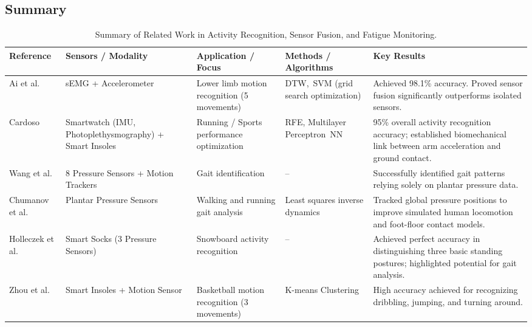 \subsection{Summary}
\label{ssec:rw_summary}

\begin{table}[ht]
\centering
\caption{Summary of Related Work in Activity Recognition, Sensor Fusion, and Fatigue Monitoring.}
\label{tab:related_work}
\renewcommand{\arraystretch}{1.2}
\footnotesize
\begin{tabularx}{\textwidth}{|p{2cm}|p{2cm}|p{2cm}|p{2cm}|X|}
\hline
\textbf{Reference} &
\textbf{Sensors / Modality} &
\textbf{Application / Focus} &
\textbf{Methods / Algorithms} &
\textbf{Key Results} \\
\hline

Ai et al.~\cite{ResearchOnLowerLimbMotionRecognition} &
sEMG + Accelerometer &
Lower limb motion recognition (5 movements) &
\gls{DTW},~\gls{SVM} (grid search optimization) &
Achieved 98.1\% accuracy. Proved sensor fusion significantly outperforms isolated sensors. \\
\hline

Cardoso~\cite{porto} &
Smartwatch (\gls{IMU}, Photoplethysmography) + Smart Insoles &
Running / Sports performance optimization &
\gls{RFE}, Multilayer Perceptron~\gls{NN} &
95\% overall activity recognition accuracy; established biomechanical link between arm acceleration and ground contact. \\
\hline

Wang et al.~\cite{freewalker} &
8 Pressure Sensors + Motion Trackers &
Gait identification &
-- &
Successfully identified gait patterns relying solely on plantar pressure data. \\
\hline

Chumanov et al.~\cite{posDuringWalking} &
Plantar Pressure Sensors &
Walking and running gait analysis &
Least squares inverse dynamics &
Tracked global pressure positions to improve simulated human locomotion and foot-floor contact models. \\
\hline

Holleczek et al.~\cite{snowboard} &
Smart Socks (3 Pressure Sensors) &
Snowboard activity recognition &
-- &
Achieved perfect accuracy in distinguishing three basic standing postures; highlighted potential for gait analysis. \\
\hline

Zhou et al.~\cite{basketballMotions} &
Smart Insoles + Motion Sensor &
Basketball motion recognition (3 movements) &
K-means Clustering &
High accuracy achieved for recognizing dribbling, jumping, and turning around. \\
\hline


\end{tabularx}
\end{table}
